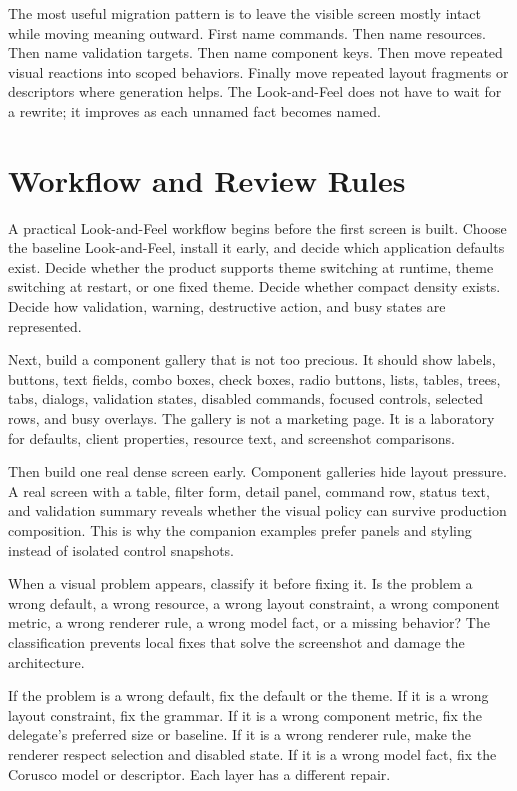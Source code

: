 The most useful migration pattern is to leave the visible screen mostly intact while moving meaning outward. First name commands. Then name resources. Then name validation targets. Then name component keys. Then move repeated visual reactions into scoped behaviors. Finally move repeated layout fragments or descriptors where generation helps. The Look-and-Feel does not have to wait for a rewrite; it improves as each unnamed fact becomes named.

\section{Workflow and Review Rules}

A practical Look-and-Feel workflow begins before the first screen is built. Choose the baseline Look-and-Feel, install it early, and decide which application defaults exist. Decide whether the product supports theme switching at runtime, theme switching at restart, or one fixed theme. Decide whether compact density exists. Decide how validation, warning, destructive action, and busy states are represented.

Next, build a component gallery that is not too precious. It should show labels, buttons, text fields, combo boxes, check boxes, radio buttons, lists, tables, trees, tabs, dialogs, validation states, disabled commands, focused controls, selected rows, and busy overlays. The gallery is not a marketing page. It is a laboratory for defaults, client properties, resource text, and screenshot comparisons.

Then build one real dense screen early. Component galleries hide layout pressure. A real screen with a table, filter form, detail panel, command row, status text, and validation summary reveals whether the visual policy can survive production composition. This is why the companion examples prefer \miglayout{} panels and \flatlaf{} styling instead of isolated control snapshots.

When a visual problem appears, classify it before fixing it. Is the problem a wrong default, a wrong resource, a wrong layout constraint, a wrong component metric, a wrong renderer rule, a wrong model fact, or a missing behavior? The classification prevents local fixes that solve the screenshot and damage the architecture.

If the problem is a wrong default, fix the default or the theme. If it is a wrong layout constraint, fix the \miglayout{} grammar. If it is a wrong component metric, fix the delegate's preferred size or baseline. If it is a wrong renderer rule, make the renderer respect selection and disabled state. If it is a wrong model fact, fix the Corusco model or descriptor. Each layer has a different repair.

